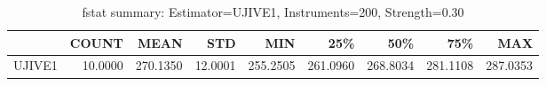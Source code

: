 \begin{table}[ht]
\centering
\caption{fstat summary: Estimator=UJIVE1, Instruments=200, Strength=0.30}
\begin{tabular}{lrrrrrrrr}
\toprule
 & COUNT & MEAN & STD & MIN & 25\% & 50\% & 75\% & MAX \\
\midrule
UJIVE1 & 10.0000 & 270.1350 & 12.0001 & 255.2505 & 261.0960 & 268.8034 & 281.1108 & 287.0353 \\
\bottomrule
\end{tabular}
\end{table}
